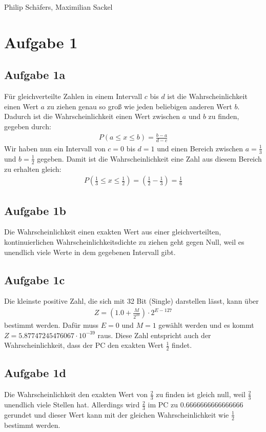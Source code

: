 Philip Schäfers, Maximilian Sackel
\section*{Aufgabe 1}
\subsection*{Aufgabe 1a}
Für gleichverteilte Zahlen in einem Intervall $c$ bis $d$ ist die Wahrscheinlichkeit einen Wert $a$ zu ziehen genau so groß wie jeden beliebigen anderen Wert $b$. Dadurch ist die Wahrscheinlichkeit einen Wert zwischen $a$ und $b$ zu finden, gegeben durch:
\begin{align*}
  P(a \le x\le b) = \frac{b - a}{d - c}
\end{align*}
Wir haben nun ein Intervall von $c = 0$ bis $d = 1$ und einen Bereich zwischen $a = \frac{1}{3}$ und $b = \frac{1}{2}$ gegeben. Damit ist die Wahrscheinlichkeit eine Zahl aus diesem Bereich zu erhalten gleich:
\begin{align*}
  P\left(\frac{1}{3}\le x\le\frac{1}{2} \right) = \left(\frac{1}{2} - \frac{1}{3}\right) = \frac{1}{6}
\end{align*}

\subsection*{Aufgabe 1b}
Die Wahrscheinlichkeit einen exakten Wert aus einer gleichverteilten, kontinuierlichen Wahrscheinlichkeitsdichte zu ziehen geht gegen Null, weil es unendlich viele Werte in dem gegebenen Intervall gibt.

\subsection*{Aufgabe 1c}
Die kleinste positive Zahl, die sich mit 32 Bit (Single) darstellen lässt, kann über
\begin{align*}
  Z = \left(1.0 + \frac{M}{2^{23}}\right)\cdot 2^{E-127}
\end{align*}
bestimmt werden. Dafür muss $E = 0$ und $M = 1$ gewählt werden und es kommt $Z = 5.87747245476067 \cdot 10^{-39}$ raus. Diese Zahl entspricht auch der Wahrscheinlichkeit, dass der PC den exakten Wert $\frac{1}{2}$ findet.

\subsection*{Aufgabe 1d}
Die Wahrscheinlichkeit den exakten Wert von $\frac{2}{3}$ zu finden ist gleich null, weil $\frac{2}{3}$ unendlich viele Stellen hat. Allerdings wird $\frac{2}{3}$ im PC zu 0.6666666666666666 gerundet und dieser Wert kann mit der gleichen Wahrscheinlichkeit wie $\frac{1}{2}$ bestimmt werden.

